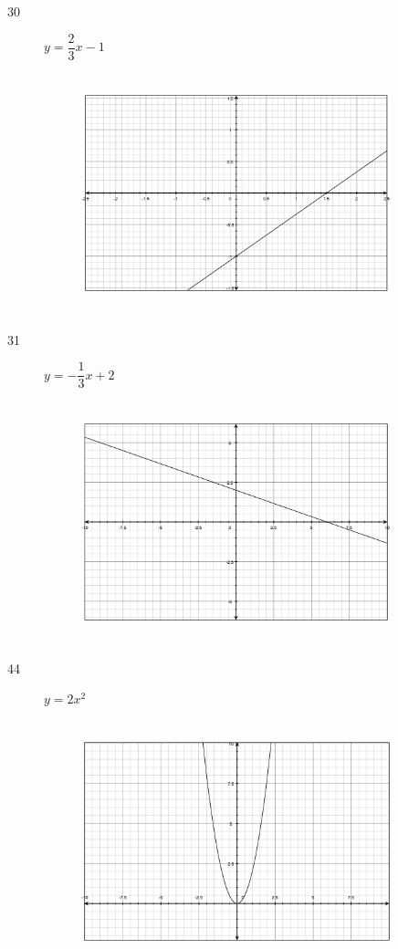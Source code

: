 \documentclass[fleqn,addpoints]{exam}
\begin{document}
\begin{description}
\item[30]
$y=\dfrac{2}{3} x - 1$
\begin{figure}[H]
  \includegraphics[width=9cm,height=7cm]{p318/30}
\end{figure}

\item[31]
$y= -\dfrac{1}{3} x + 2$
\begin{figure}[H]
  \includegraphics[width=9cm,height=7cm]{p318/31}
\end{figure}

\item[44]
$y= 2x^2$
\begin{figure}[H]
  \includegraphics[width=9cm,height=7cm]{p318/44}
\end{figure}


\end{description}
\end{document}
